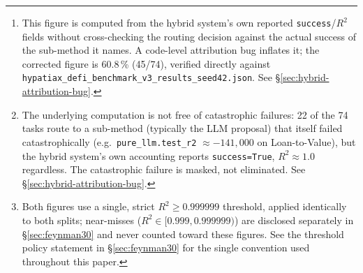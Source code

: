 \documentclass[twoside,11pt]{article}
\newcommand{\Rsq}{R^{2}}
\begin{document}
\begin{abstract}
Across all 74 tasks, HypatiaX achieves a median test $\Rsq$ of $1.00$ and a
near-perfect success rate ($\Rsq>0.99$) of \textbf{89.2\,\%}\footnote{This
figure is computed from the hybrid system's own reported \texttt{success}/$\Rsq$
fields without cross-checking the routing decision against the actual success
of the sub-method it names. A code-level attribution bug inflates it; the
corrected figure is 60.8\,\% (45/74), verified directly against
\texttt{hypatiax\_defi\_benchmark\_v3\_results\_seed42.json}. See
\S\ref{sec:hybrid-attribution-bug}.}---a $+27$
percentage point gain over the LLM baseline and $+83.8$\,pp over the neural
network---while \textbf{eliminating all catastrophic failures in HypatiaX's
own reported output}\footnote{The underlying computation is not free of
catastrophic failures: 22 of the 74 tasks route to a sub-method (typically
the LLM proposal) that itself failed catastrophically (e.g.\
\texttt{pure\_llm.test\_r2} $\approx -141{,}000$ on Loan-to-Value), but the
hybrid system's own accounting reports \texttt{success=True},
$\Rsq \approx 1.0$ regardless. The catastrophic failure is masked, not
eliminated. See \S\ref{sec:hybrid-attribution-bug}.}.
Gains scale with difficulty in the uncorrected figures: $+38.1$\,pp on hard
transcendental tasks (76.2\,\% vs.\ 38.1\,\% for the LLM alone)
\textbf{[flagged: corrected gain on Hard is $-4.8$\,pp, i.e.\ a loss, not a
gain; see \S\ref{sec:hybrid-attribution-bug}]}.
On the standard Nguyen-12 suite, HypatiaX achieves 11/12 recovery (91.7\,\%)
versus 10/12 for PySR-only and 0/12 for the neural baseline.
A previously reported $1.73\times$ median speedup of HypatiaX over
neural-network inference on LLM-routed cases (68 of 74) does
\textbf{not} reproduce: mechanical regeneration of the runtime table
directly from the raw per-task result files, across the complete,
verified 5-seed$\times$74-task sweep, shows the hybrid system is
$2.5$--$9.3\times$ \emph{slower} than the neural baseline on every seed
and every split, never faster (see \S\ref{sec:timing}).
On 30 Feynman equations spanning mechanics to quantum physics, HypatiaX
achieves 12/30 near-perfect recovery under a random 80/20 split and 13/30
under a PCA-directed 40\,\%/60\,\% split\footnote{Both figures use a single,
strict $\Rsq \geq 0.999999$ threshold, applied identically to both splits;
near-misses ($\Rsq \in [0.999, 0.999999)$) are disclosed separately in
\S\ref{sec:feynman30} and never counted toward these figures. See the
threshold policy statement in \S\ref{sec:feynman30} for the single
convention used throughout this paper.}, versus 0/30 for the neural baseline
under both protocols (see Section~\ref{sec:feynman30}), establishing that reliability gains extend beyond the DeFi domain.
These results establish \emph{reliability under distribution shift}, not raw
accuracy, as the defining advantage of hybrid symbolic--neural systems.
\end{abstract}
\end{document}

